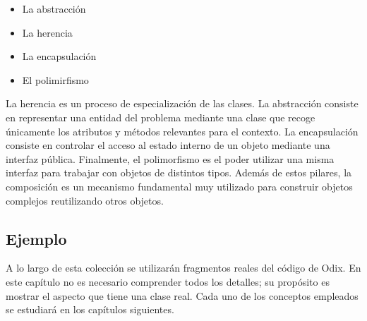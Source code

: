 \documentclass[11pt,a5paper,twoside]{book}
\begin{document}
\begin{itemize}
\item  La abstracción
\item  La herencia
\item  La encapsulación
\item  El polimirfismo
\end{itemize}
La herencia es un proceso de especialización de las clases. La abstracción consiste en representar una entidad del problema mediante una clase que recoge únicamente los atributos y métodos relevantes para el contexto. La encapsulación consiste en controlar el acceso al estado interno de un objeto mediante una interfaz pública. Finalmente, el polimorfismo es el poder utilizar una misma interfaz para trabajar con objetos de distintos tipos.
Además de estos pilares, la composición es un mecanismo fundamental muy utilizado para construir objetos complejos reutilizando otros objetos.
\subsection{Ejemplo}
A lo largo de esta colección se utilizarán fragmentos reales del código de Odix. En este capítulo no es necesario comprender todos los detalles; su propósito es mostrar el aspecto que tiene una clase real. Cada uno de los conceptos empleados se estudiará en los capítulos siguientes.

\newpage
\end{document}
